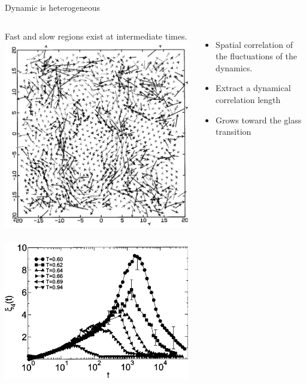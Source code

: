 \begin{frame}{Dynamic is heterogeneous}
	\begin{columns}
	Fast and slow regions exist at intermediate times.\\
	\includegraphics[width=\columnwidth]{dh_perera}\\
	{\footnotesize\citet{Perera1999}}
	{\footnotesize\citet{Lacevic2003}}\\
	\includegraphics[width=0.7\columnwidth]{xi4_lacevic}\\
	\begin{itemize}
		\item Spatial correlation of the fluctuations of the dynamics.
		\item Extract a dynamical correlation length
		\item Grows toward the glass transition
	\end{itemize}
	\end{columns}
\end{frame}

